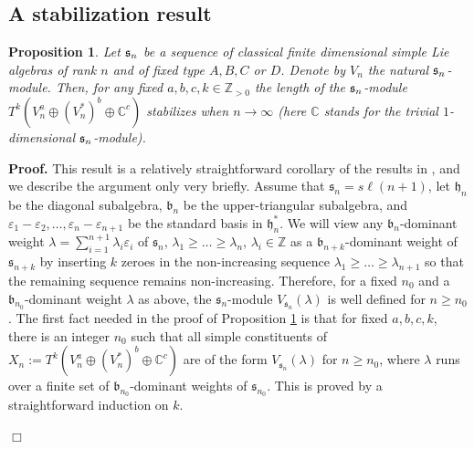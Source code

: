 \documentclass[12pt]{article}
\newcounter{theorem}
\newtheorem{prop}[theo]{Proposition}
\newenvironment{proof}{ \textbf{Proof.}}{$\Box$}
\newcommand {\ZZ} {\mathbb {Z}}
\newcommand {\CC} {\mathbb {C}}
\renewcommand{\ss}{\mathfrak{s}}
\newcommand{\hh}{\mathfrak{h}}
\newcommand{\bb}{\mathfrak{b}}
\newcommand{\refprop}[1]{Proposition \ref{#1}}
\renewcommand{\sl}{{s\ell}}
\newcommand{\eps}{\varepsilon}
\begin{document}
\subsection{A stabilization result}
\begin{prop}\label{prop11}  Let $\frak s_n$ be a sequence of classical
finite dimensional simple Lie algebras of rank $n$ and of fixed type $A, B, C$ or $D$.  Denote by $V_n$ the natural $\frak s_n$-module. Then, for any fixed $a,b,c,k\in\ZZ_{> 0}$ the length of the $\frak s_n$-module $T^k(V^a_n \oplus (V^*_n)^b\oplus \CC^c)$ stabilizes when $n\to\infty$ (here $\CC$ stands for the trivial $1$-dimensional $\frak s_n$-module).
\end{prop}
\begin{proof}
This result is a relatively straightforward corollary of the results in \cite{HTW}, and we describe the argument only very briefly. Assume that $\ss_n=\sl(n+1)$, let $\hh_n$ be the diagonal subalgebra, $\bb_n$ be the upper-triangular subalgebra, and $\eps_1-\eps_2,\dots, \eps_n-\eps_{n+1}$ be the standard basis in $\hh_n^*$. We will view any $\bb_n$-dominant weight $\lambda=\sum_{i=1}^{n+1}\lambda_i\eps_i$ of $\ss_n$, $\lambda_1\geq\dots\geq\lambda_n$, $\lambda_i\in\ZZ$ as a $\bb_{n+k}$-dominant weight of $\ss_{n+k}$ by inserting $k$ zeroes in the non-increasing sequence $\lambda_1\geq\dots\geq\lambda_{n+1}$ so that the remaining sequence remains non-increasing. Therefore, for a fixed $n_0$ and a $\bb_{n_0}$-dominant weight $\lambda$ as above, the $\ss_n$-module $V_{\ss_n}(\lambda)$ is well defined for $n\geq n_0$. The first fact needed in the proof of \refprop{prop11} is that for fixed $a,b,c,k$, there is an integer $n_0$ such that all simple constituents of $X_n:=T^k(V_n^a\oplus(V_n^*)^b\oplus\CC^c)$ are of the form $V_{\ss_n}(\lambda)$ for $n\geq n_0$, where $\lambda$ runs over a finite set of $\bb_{n_0}$-dominant weights of $\ss_{n_0}$. This is proved by a straightforward induction on $k$.


\end{proof}
\end{document}
